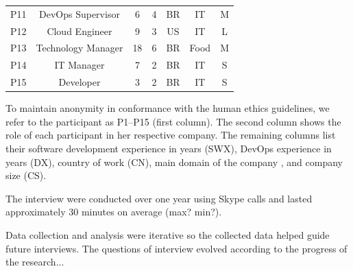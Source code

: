 \begin{table}[t]
\begin{tabular}{ccccccc}
P11                  & DevOps Supervisor                & 6            & 4           & BR            & IT                  & M                               \\

P12                  & Cloud Engineer              & 9            & 3           & US            & IT                  & L                               \\

P13                  & Technology Manager                 & 18            & 6           & BR            & Food                  & M                               \\

P14                  & IT Manager            & 7            & 2           & BR            & IT                  & S                               \\

P15                  & Developer        & 3            & 2           & BR            & IT                  & S
\end{tabular}
\end{table}


To maintain anonymity in conformance with the human ethics guidelines,
we refer to the participant as P1--P15 (first column).
The second column shows the role of
each participant in her respective company. The remaining columns list their
software development experience in years (SWX), DevOps experience in years (DX),
country of work (CN), main domain of the company , and company
size (CS).


The interview were conducted over one year using Skype calls and lasted
approximately 30 minutes on average (max? min?).

Data collection and analysis were iterative so the collected data helped guide
future interviews. The questions of interview evolved according to the progress
of the research...

